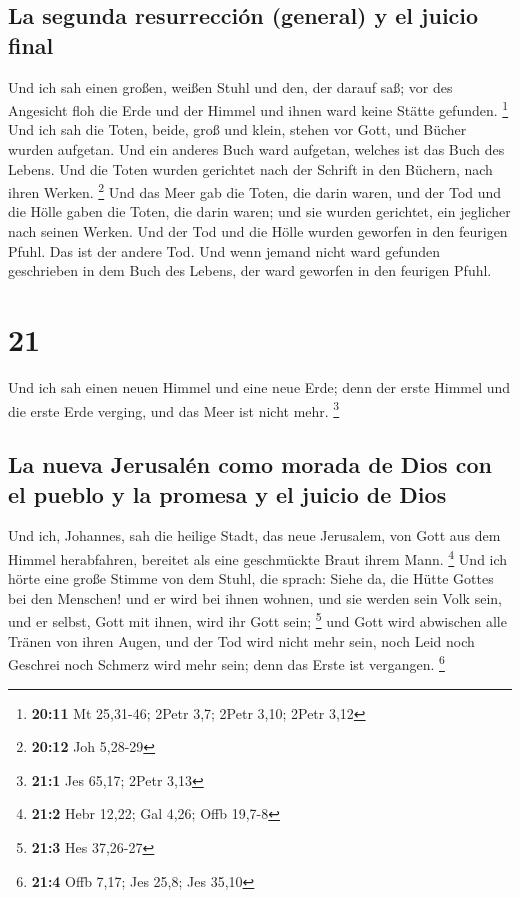 \hypertarget{la-segunda-resurrecciuxf3n-general-y-el-juicio-final}{%
\subsection{La segunda resurrección (general) y el juicio
final}\label{la-segunda-resurrecciuxf3n-general-y-el-juicio-final}}

 Und ich sah einen großen, weißen Stuhl und den, der
darauf saß; vor des Angesicht floh die Erde und der Himmel und ihnen
ward keine Stätte gefunden. \footnote{\textbf{20:11} Mt 25,31-46; 2Petr
  3,7; 2Petr 3,10; 2Petr 3,12}  Und ich sah die Toten,
beide, groß und klein, stehen vor Gott, und Bücher wurden aufgetan. Und
ein anderes Buch ward aufgetan, welches ist das Buch des Lebens. Und die
Toten wurden gerichtet nach der Schrift in den Büchern, nach ihren
Werken. \footnote{\textbf{20:12} Joh 5,28-29}  Und das
Meer gab die Toten, die darin waren, und der Tod und die Hölle gaben die
Toten, die darin waren; und sie wurden gerichtet, ein jeglicher nach
seinen Werken.  Und der Tod und die Hölle wurden geworfen
in den feurigen Pfuhl. Das ist der andere Tod.  Und wenn
jemand nicht ward gefunden geschrieben in dem Buch des Lebens, der ward
geworfen in den feurigen Pfuhl.

\hypertarget{section-20}{%
\section{21}\label{section-20}}

 Und ich sah einen neuen Himmel und eine neue Erde; denn
der erste Himmel und die erste Erde verging, und das Meer ist nicht
mehr. \footnote{\textbf{21:1} Jes 65,17; 2Petr 3,13}

\hypertarget{la-nueva-jerusaluxe9n-como-morada-de-dios-con-el-pueblo-y-la-promesa-y-el-juicio-de-dios}{%
\subsection{La nueva Jerusalén como morada de Dios con el pueblo y la
promesa y el juicio de
Dios}\label{la-nueva-jerusaluxe9n-como-morada-de-dios-con-el-pueblo-y-la-promesa-y-el-juicio-de-dios}}

 Und ich, Johannes, sah die heilige Stadt, das neue
Jerusalem, von Gott aus dem Himmel herabfahren, bereitet als eine
geschmückte Braut ihrem Mann. \footnote{\textbf{21:2} Hebr 12,22; Gal
  4,26; Offb 19,7-8}  Und ich hörte eine große Stimme von
dem Stuhl, die sprach: Siehe da, die Hütte Gottes bei den Menschen! und
er wird bei ihnen wohnen, und sie werden sein Volk sein, und er selbst,
Gott mit ihnen, wird ihr Gott sein; \footnote{\textbf{21:3} Hes 37,26-27}
 und Gott wird abwischen alle Tränen von ihren Augen, und
der Tod wird nicht mehr sein, noch Leid noch Geschrei noch Schmerz wird
mehr sein; denn das Erste ist vergangen. \footnote{\textbf{21:4} Offb
  7,17; Jes 25,8; Jes 35,10}

